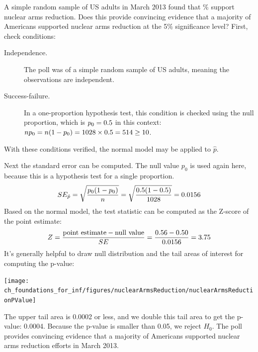 \begin{examplewrap}
\begin{nexample}{A simple random sample of
    \gallupnucleararmspollsize{} US adults
    in March 2013 found that
    \gallupnucleararmspollpercent{}\% support nuclear arms
    reduction.\footnotemark
    Does this provide convincing evidence that a majority
    of Americans supported nuclear arms reduction at the
    5\% significance level?} \label{NuclearArmsInferenceExample}
  First, check conditions:
  \begin{description}
  \item[Independence.] The poll was of a simple random sample
      of US adults, meaning the observations are independent.
  \item[Success-failure.] In a one-proportion hypothesis test,
      this condition is checked using the null proportion,
      which is $p_0 = 0.5{}$
      in this context:
      $n p_0 = n (1 - p_0)
          = 1028{} \times
              0.5{}
          = 514{} \geq 10$.
  \end{description}
  With these conditions verified,
  the normal model may be applied to $\hat{p}$.

  Next the standard error can be computed.
  The null value $p_0$ is used again here,
  because this is a hypothesis test for a single proportion.
  \begin{align*}
  SE_{\hat{p}}
      = \sqrt{\frac{p_0 (1 - p_0)}{n}}
      = \sqrt{\frac{0.5{}
          (1 - 0.5{})}
          {1028{}}}
      = 0.0156{}
  \end{align*}
  Based on the normal model, the test statistic can be
  computed as the Z-score of the point estimate:
  \begin{align*}
  Z = \frac{\text{point estimate} - \text{null value}}{SE}
      = \frac{0.56{} - 0.50}
          {0.0156{}}
      = 3.75
  \end{align*}
  It's generally helpful to draw null distribution and
  the tail areas of interest for computing the p-value:
  \begin{center}
  \texttt{[image: ch\_foundations\_for\_inf/figures/nuclearArmsReduction/nuclearArmsReductionPValue]}
  \end{center}
  The upper tail area is 0.0002 or less,
  and we double this tail area to get the p-value: 0.0004.
  Because the p-value is smaller than 0.05, we reject $H_0$.
  The poll provides convincing evidence that a majority
  of Americans supported nuclear arms reduction efforts
  in March 2013.
\end{nexample}
\end{examplewrap}


